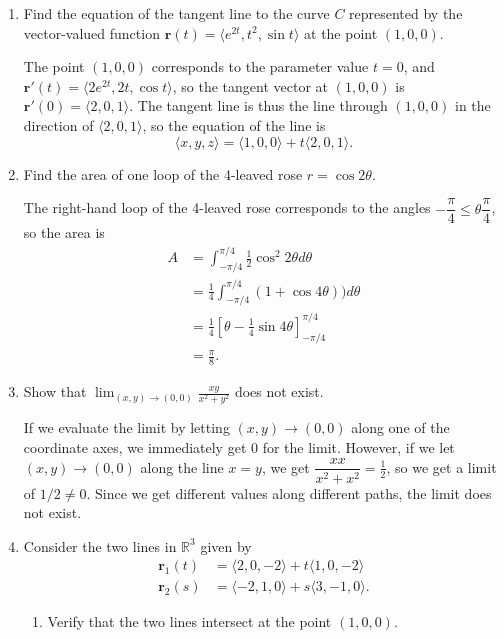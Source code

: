 \documentclass[12pt]{article}
\newcommand{\points}[1]{\marginpar{\hspace{24pt}[#1]}}
\newcommand{\di}{\displaystyle}
\newcommand{\R}{\mathbb{R}}
\begin{document}
\begin{enumerate}
\item Find the equation of the tangent line to the curve $C$ represented by the vector-valued function $\mathbf{r}(t) = \langle e^{2t}, t^2, \sin t\rangle$ at the point $(1,0,0)$.\points{4}

\bigskip

The point $(1,0,0)$ corresponds to the parameter value $t=0$, and $\mathbf{r}'(t) =\langle 2e^{2t}, 2t, \cos t\rangle$, so the tangent vector at $(1,0,0)$ is $\mathbf{r}'(0) = \langle 2, 0, 1\rangle$. The tangent line is thus the line through $(1,0,0)$ in the direction of $\langle 2,0,1\rangle$, so the equation of the line is
\[
 \langle x,y,z\rangle = \langle 1,0,0\rangle +t\langle 2,0,1\rangle.
\]

\bigskip

\bigskip

\item Find the area of one loop of the 4-leaved rose $r=\cos 2\theta$. \points{5}

\bigskip

The right-hand loop of the 4-leaved rose corresponds to the angles $-\dfrac{\pi}{4}\leq \theta\dfrac{\pi}{4}$, so the area is
\begin{align*}
 A & = \int_{-\pi/4}^{\pi/4}\frac{1}{2}\cos^2 2\theta d\theta\\
& = \frac{1}{4}\int_{-\pi/4}^{\pi/4}\left(1+\cos 4\theta\right))d\theta\\
& = \frac{1}{4}\left[\theta - \frac{1}{4}\sin 4\theta\right]_{-\pi/4}^{\pi/4}\\
& = \frac{\pi}{8}.
\end{align*}

\bigskip

\item Show that $\di \lim_{(x,y)\to (0,0)}\frac{xy}{x^2+y^2}$ does not exist. \points{3}

\bigskip

If we evaluate the limit by letting $(x,y)\to (0,0)$ along one of the coordinate axes, we immediately get 0 for the limit. However, if we let $(x,y)\to (0,0)$ along the line $x=y$, we get $\dfrac{xx}{x^2+x^2} = \frac{1}{2}$, so we get a limit of $1/2\neq 0$. Since we get different values along different paths, the limit does not exist.

\newpage

\item Consider the two lines in $\R^3$ given by
\begin{align*}
\mathbf{r}_1(t) & = \langle 2,0,-2\rangle + t\langle 1,0,-2\rangle\\
\mathbf{r}_2(s) & = \langle -2,1,0\rangle +s\langle 3,-1,0\rangle.
\end{align*}
\begin{enumerate}
\item Verify that the two lines intersect at the point $(1,0,0)$. \points{2}


\end{enumerate}
\end{enumerate}
\end{document}
